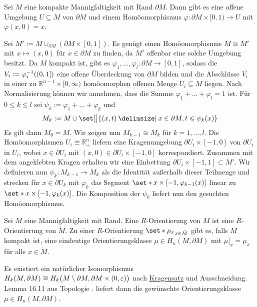 \begin{satz}[name={Kragensatz},label=kragensatz]
	Sei $M$ eine kompakte Mannigfaltigkeit mit Rand $\partial M$. 
	Dann gibt es eine offene Umgebung $U \subseteq M$ von $\partial M$ und einem Homöomorphismus $\varphi \colon \partial M \times [0,1) \to U$ mit ${\varphi(x,0)=x}$.
\end{satz}
\begin{beweis}[name={\cite[Prop.~3.42]{Hatcher}}]
	Sei $M' := M \cup_{\partial M} (\partial M \times [0,1])$.
	Es genügt einen Homöomorphismus $M \cong M'$ mit $x \mapsto (x,0)$ für $x \in \partial M$ zu finden, da $M'$ offenbar eine solche Umgebung besitzt. 
	Da $M$ kompakt ist, gibt es $\varphi_1, \ldots , \varphi_l \colon \partial M \to [0,1]$, sodass die $V_i := \varphi_i^{-1}\enbrace*{(0,1]}$ eine offene Überdeckung von $\partial M$ bilden und die Abschlüsse $\overline{V_i}$ in einer zu $\mathbb{R}^{n-1} \times [0,\infty)$ homöomorphen offenen Menge $U_i \subseteq M$ liegen. 
	Nach Normalisierung können wir annehmen, dass die Summe $\varphi_1 + \ldots + \varphi_l =1$ ist.
	Für $0 \le k \le l$ sei $\psi_k := \varphi_1 + \ldots + \varphi_k$ und 
	\[
		M_k := M \cup \set[\big]{(x,t) \given x \in \partial M, t \le \psi_k(x)}
	\]
	Es gilt dann $M_0=M$.
	Wir zeigen nun $M_{k-1} \cong M_k$ für $k=1,\ldots ,l$.
	Die Homöomorphismen $U_i \cong \mathbb{R}^n_+$ liefern eine Kragenumgebung $\partial U_i \times [-1,0]$ von $\partial U_i$ in $U_i$, wobei $x \in \partial U_i$ mit $(x,0) \in \partial U_i \times [-1,0]$ korrespondiert.
	Zusammen mit dem angeklebten Kragen erhalten wir eine Einbettung $\partial U_i \times [-1,1] \subset M'$.
	Wir definieren nun $\psi_k \colon M_{k-1} \to M_k$ als die Identität außerhalb dieser Teilmenge und strecken für $x \in \partial U_k$ mit $\varphi_k$ das Segment $\set*{x} \times [-1, \varphi_{k-1}(x)]$ linear zu $\set*{x} \times [-1,\varphi_k(x)]$.
	Die Komposition der $\psi_k$ liefert nun den gesuchten Homöomorphismus.
\end{beweis}

\begin{bemerkung}[{name=[Orientierung einer Mannigfaltigkeit mit Rand]},label=bem:orientierung_rand]
	Sei $M$ eine Mannigfaltigkeit mit Rand. 
	Eine $R$-Orientierung von $M$ ist eine $R$-Orientierung von $\mathring{M}$.
	Zu einer $R$-Orientierung $\set*{\mu_x}_{x \in \mathring{M}}$ gibt es, falls $M$ kompakt ist, eine eindeutige Orientierungsklasse $\mu \in H_n(M, \partial M)$ mit $\mu|_x = \mu_x$ für alle $x \in \mathring{M}$.
\end{bemerkung}
\begin{beweis}
	Es existiert ein natürlicher Isomorphismus $H_k(M,\partial M) \cong H_k \enbrace[\big]{M \setminus \partial M, \partial M \times (0,\varepsilon)}$ nach \hyperref[kragensatz]{Kragensatz} und Ausschneidung.
	Lemma 16.11 aus Topologie . liefert dann die gewünschte Orientierungsklasse $\mu \in H_n(M, \partial M)$.
\end{beweis}

